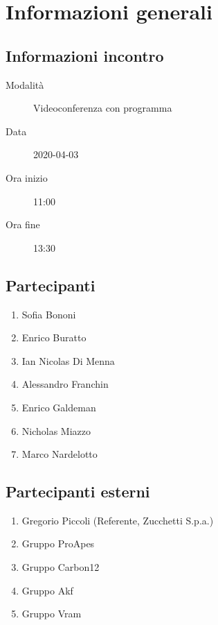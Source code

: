 \documentclass{article}
\begin{document}


\section{Informazioni generali}%
\label{sec:informazioni_generali}

\subsection{Informazioni incontro}%
\label{sub:informazioni_incontro}

\begin{description}
  \item[Modalità] Videoconferenza con programma 
  \item[Data] 2020-04-03
  \item[Ora inizio] 11:00
  \item[Ora fine] 13:30
\end{description}

\subsection{Partecipanti}%
\label{sub:partecipanti}

\begin{enumerate}
  \item Sofia Bononi
  \item Enrico Buratto
  \item Ian Nicolas Di Menna
  \item Alessandro Franchin
  \item Enrico Galdeman
  \item Nicholas Miazzo
  \item Marco Nardelotto
\end{enumerate}

\subsection{Partecipanti esterni}%
\label{sub:partecipanti esterni}

\begin{enumerate}
    \item Gregorio Piccoli (Referente, Zucchetti S.p.a.)
    \item Gruppo ProApes
    \item Gruppo Carbon12
    \item Gruppo Akf
    \item Gruppo Vram
\end{enumerate}
\end{document}
